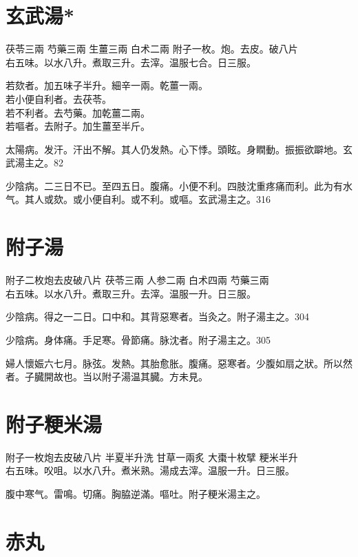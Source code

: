 \section{玄武湯*}

茯苓{\scriptsize 三兩} 芍藥{\scriptsize 三兩} 生薑{\scriptsize 三兩} 白术{\scriptsize 二兩} 附子{\scriptsize 一枚。炮。去皮。破八片}\\
右五味。以水八升。煮取三升。去滓。温服七合。日三服。

若欬者。加五味子半升。細辛一兩。乾薑一兩。\\
若小便自利者。去茯苓。\\
若不利者。去芍藥。加乾薑二兩。\\
若嘔者。去附子。加生薑至半斤。

太陽病。发汗。汗出不解。其人仍发熱。心下悸。頭眩。身瞤動。振振欲躃地。玄武湯主之。82

少陰病。二三日不已。至四五日。腹痛。小便不利。四肢沈重疼痛而利。此为有水气。其人或欬。或小便{\khaaitp 自}利。或不利。或嘔。玄武湯主之。316

\section{附子湯}

附子{\scriptsize 二枚炮去皮破八片} 茯苓{\scriptsize 三兩} 人参{\scriptsize 二兩} 白术{\scriptsize 四兩} 芍藥{\scriptsize 三兩}\\
右五味。以水八升。煮取三升。去滓。温服一升。日三服。

少陰病。得之一二日。口中和。其背惡寒者。当灸之。附子湯主之。304

少陰病。身体痛。手足寒。骨節痛。脉沈者。附子湯主之。305

婦人懷娠六七月。脉弦。发熱。其胎愈胀。腹痛。惡寒者。少腹如扇之狀。所以然者。子臓開故也。当以附子湯温其臓。{\scriptsize 方未見。}

\section{附子粳米湯}

附子{\scriptsize 一枚炮去皮破八片} 半夏{\scriptsize 半升洗} 甘草{\scriptsize 一兩炙} 大棗{\scriptsize 十枚擘} 粳米{\scriptsize 半升}\\
右五味。㕮咀。以水八升。煮米熟。湯成去滓。温服一升。日三服。

腹中寒气。雷鳴。切痛。胸脇逆滿。嘔吐。附子粳米湯主之。

\section{赤丸}

